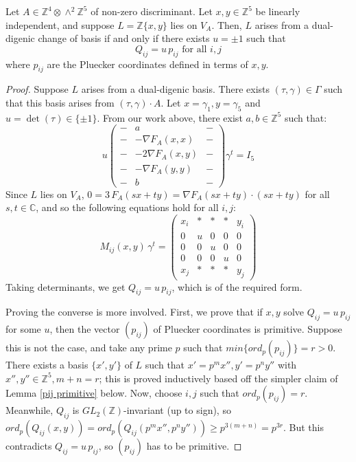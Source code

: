 \documentclass{report}
\begin{document}
\begin{prop} \label{dual-digenic equations}
Let $A \in \mathbb{Z}^4 \otimes \wedge^2 \mathbb{Z}^5$ of non-zero discriminant.  Let $x,y \in \mathbb{Z}^5$ be linearly independent, and suppose $L = \mathbb{Z}\{x,y\}$ lies on $V_A$. Then, $L$ arises from a dual-digenic change of basis if and only if there exists $u = \pm 1$ such that
\begin{equation}
Q_{ij} = u \, p_{ij} \text{ for all $i,j$}
\end{equation}
where $p_{ij}$ are the Pluecker coordinates defined in terms of $x,y$.
\end{prop}
\begin{proof}
Suppose $L$ arises from a dual-digenic basis.  There exists $(\tau,\gamma) \in \Gamma$ such that this basis arises from $(\tau, \gamma) \cdot A$.  Let $x = \gamma_1, y = \gamma_5$ and $u = \det(\tau) \in \{ \pm 1 \}$.  From our work above, there exist $a,b \in \mathbb{Z}^5$ such that:
\begin{equation}
u
\begin{pmatrix}
- & a & - \\
- & - \nabla F_A(x,x) & - \\
- & - 2 \nabla F_A(x,y) & - \\
- & - \nabla F_A(y,y) & - \\
- & b & -
\end{pmatrix} \gamma^t = I_5
\end{equation}
Since $L$ lies on $V_A$, $0 = 3 \, F_A(sx+ty) = \nabla F_A(sx + ty) \cdot (sx + ty)$ for all $s,t \in \mathbb{C}$, and so the following equations hold for all $i,j$:
\begin{equation}
M_{ij}(x,y) \, \gamma^t = 
\begin{pmatrix}
x_i & * & * & * & y_i \\
0 & u & 0 & 0 & 0 \\
0 & 0 & u & 0 & 0 \\
0 & 0 & 0 & u & 0 \\
x_j & * & * & * & y_j
\end{pmatrix}
\end{equation}
Taking determinants, we get $Q_{ij} = u \, p_{ij}$, which is of the required form.

Proving the converse is more involved.  First, we prove that if $x,y$ solve $Q_{ij} = u \, p_{ij}$ for some $u$, then the vector $(p_{ij})$ of Pluecker coordinates is primitive.  Suppose this is not the case, and take any prime $p$ such that $min\{ord_p(p_{ij})\} = r > 0$.  There exists a basis $\{x',y'\}$ of $L$ such that $x' = p^m x'', y' = p^n y''$ with $x'',y'' \in \mathbb{Z}^5, m+n = r$; this is proved inductively based off the simpler claim of Lemma \ref{pij primitive} below.  Now, choose $i,j$ such that $ord_p(p_{ij}) = r$.  Meanwhile, $Q_{ij}$ is $GL_2(\mathbb{Z})$-invariant (up to sign), so $ord_p(Q_{ij}(x,y)) = ord_p(Q_{ij}(p^m x'', p^n y'')) \geq p^{3(m+n)} = p^{3r}$.  But this contradicts $Q_{ij} = u \, p_{ij}$, so $(p_{ij})$ has to be primitive.


\end{proof}
\end{document}
